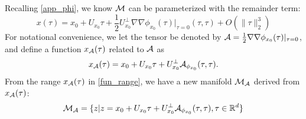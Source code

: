 \documentclass{article}
\newtheorem{theorem}{Theorem}[section]
\theoremstyle{remark}
\begin{document}
%
Recalling \eqref{app_phi}, we know $\cal M$ can be parameterized with the remainder term:
\[
 x(\tau)= x_0+ U_{x_0} \tau + \frac{1}{2} U_{x_0}^{\perp}{\nabla\nabla\phi_{x_0}(\tau)|_{\tau=0}}(\tau, \tau)+O(\|\tau\|_2^3)
\]
For notational convenience, we let the tensor be denoted by ${\cal A}=\frac{1}{2} {\nabla\nabla\phi_{x_0}(\tau)|_{\tau=0}}$, and define a function $x_{\cal A}(\tau)$ related to $\cal A$ as
\begin{equation}\label{fun_range}
x_{\cal A}(\tau) = x_0+ U_{x_0} \tau + U_{x_0}^{\perp} {\cal A}_{\phi_{x_0}}(\tau, \tau).
\end{equation}
From the range $x_{\cal A}(\tau)$ in \eqref{fun_range}, we have a new manifold ${\cal M_A}$ derived from $x_{\cal A}(\tau)$:
\begin{equation}\label{M_a}
{\cal M_A} = \{ z| z =  x_0+ U_{x_0} \tau + U_{x_0}^{\perp} {\cal A}_{\phi_{x_0}}(\tau, \tau), \tau \in {\mathbb R}^d\}
\end{equation}
\end{document}

